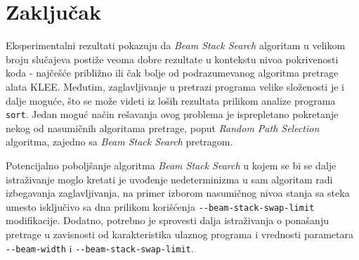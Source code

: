 \documentclass[a4paper]{article}
\begin{document}
\section{Zaključak}

Eksperimentalni rezultati pokazuju da \textit{Beam Stack Search} algoritam u velikom broju slučajeva postiže veoma dobre rezultate u kontekstu nivoa pokrivenosti koda - najčešće približno ili čak bolje od podrazumevanog algoritma pretrage alata KLEE. Međutim, zaglavljivanje u pretrazi programa velike složenosti je i dalje moguće, što se može videti iz loših rezultata prilikom analize programa \verb|sort|. Jedan moguć način rešavanja ovog problema je isprepletano pokretanje nekog od nasumičnih algoritama pretrage, poput \textit{Random Path Selection} algoritma, zajedno sa \textit{Beam Stack Search} pretragom.

Potencijalno poboljšanje algoritma \textit{Beam Stack Search} u kojem se bi se dalje istraživanje moglo kretati je uvođenje nedeterminizma u sam algoritam radi izbegavanja zaglavljivanja, na primer izborom nasumičnog nivoa stanja sa steka umesto isključivo sa dna prilikom korišćenja \verb|--beam-stack-swap-limit| modifikacije. Dodatno, potrebno je sprovesti dalja istraživanja o ponašanju pretrage u zavisnosti od karakteristika ulaznog programa i vrednosti parametara \verb|--beam-width| i \verb|--beam-stack-swap-limit|.

\appendix
 

\end{document}
